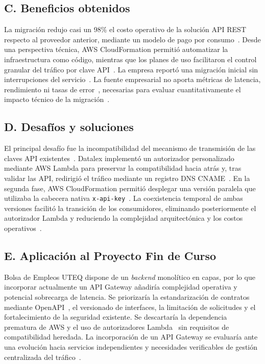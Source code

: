 \documentclass[11pt,a4paper]{article}
\begin{document}
\subsection*{C. Beneficios obtenidos}
La migraci\'on redujo casi un 98\% el costo operativo de la soluci\'on API REST respecto al proveedor anterior, mediante un modelo de pago por consumo~\cite{prenty2020datalex}. Desde una perspectiva t\'ecnica, AWS CloudFormation permiti\'o automatizar la infraestructura como c\'odigo, mientras que los planes de uso facilitaron el control granular del tr\'afico por clave API~\cite{prenty2020datalex}. La empresa report\'o una migraci\'on inicial sin interrupciones del servicio~\cite{prenty2020datalex}. La fuente empresarial no aporta m\'etricas de latencia, rendimiento ni tasas de error~\cite{prenty2020datalex}, necesarias para evaluar cuantitativamente el impacto t\'ecnico de la migraci\'on~\cite{aydemir2025apigateway,moreira2023age}.

\subsection*{D. Desaf\'ios y soluciones}
El principal desaf\'io fue la incompatibilidad del mecanismo de transmisi\'on de las claves API existentes~\cite{prenty2020datalex}. Datalex implement\'o un autorizador personalizado mediante AWS Lambda para preservar la compatibilidad hacia atr\'as y, tras validar las API, redirigi\'o el tr\'afico mediante un registro DNS CNAME~\cite{prenty2020datalex}. En la segunda fase, AWS CloudFormation permiti\'o desplegar una versi\'on paralela que utilizaba la cabecera nativa \texttt{x-api-key}~\cite{prenty2020datalex}. La coexistencia temporal de ambas versiones facilit\'o la transici\'on de los consumidores, eliminando posteriormente el autorizador Lambda y reduciendo la complejidad arquitect\'onica y los costos operativos~\cite{prenty2020datalex}.

\subsection*{E. Aplicaci\'on al Proyecto Fin de Curso}
Bolsa de Empleos UTEQ dispone de un \textit{backend} monol\'itico en capas, por lo que incorporar actualmente un API Gateway a\~nadir\'ia complejidad operativa y potencial sobrecarga de latencia. Se priorizar\'ia la estandarizaci\'on de contratos mediante OpenAPI~\cite{prenty2020datalex}, el versionado de interfaces, la limitaci\'on de solicitudes y el fortalecimiento de la seguridad existente. Se descartar\'ia la dependencia prematura de AWS y el uso de autorizadores Lambda~\cite{prenty2020datalex} sin requisitos de compatibilidad heredada. La incorporaci\'on de un API Gateway se evaluar\'ia ante una evoluci\'on hacia servicios independientes y necesidades verificables de gesti\'on centralizada del tr\'afico~\cite{aydemir2025apigateway,moreira2023age}.
\end{document}
